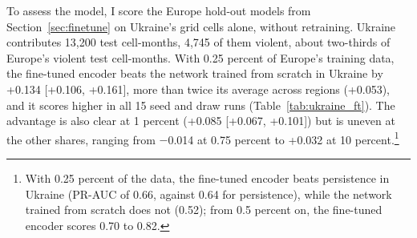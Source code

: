 \documentclass[11pt, letterpaper]{article}
\begin{document}
To assess the model, I score the Europe hold-out models from Section~\ref{sec:finetune} on Ukraine's grid cells alone, without retraining. Ukraine contributes 13,200 test cell-months, 4,745 of them violent, about two-thirds of Europe's violent test cell-months. With 0.25 percent of Europe's training data, the fine-tuned encoder beats the network trained from scratch in Ukraine by +0.134 [+0.106, +0.161], more than twice its average across regions (+0.053), and it scores higher in all 15 seed and draw runs (Table~\ref{tab:ukraine_ft}). The advantage is also clear at 1 percent (+0.085 [+0.067, +0.101]) but is uneven at the other shares, ranging from $-$0.014 at 0.75 percent to +0.032 at 10 percent.\footnote{With 0.25 percent of the data, the fine-tuned encoder beats persistence in Ukraine (PR-AUC of 0.66, against 0.64 for persistence), while the network trained from scratch does not (0.52); from 0.5 percent on, the fine-tuned encoder scores 0.70 to 0.82.}
\end{document}

